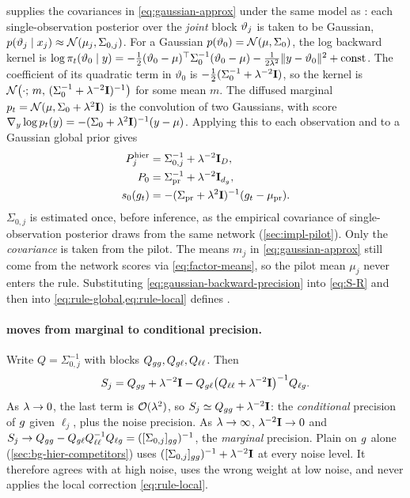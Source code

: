 \arrowm{} supplies the covariances in \cref{eq:gaussian-approx} under the same model as \gauss: each single-observation posterior over the \emph{joint} block $\vartheta_j$ is taken to be Gaussian, $p(\vartheta_j\mid x_j)\approx\mathcal{N}(\mu_j,\Sigma_{0,j})$.
For a Gaussian $p(\vartheta_0)=\mathcal{N}(\mu,\Sigma_0)$, the log backward kernel is
$\log\pi_t(\vartheta_0\mid y)=-\tfrac12(\vartheta_0-\mu)^\top\Sigma_0^{-1}(\vartheta_0-\mu)-\tfrac1{2\lambda^2}\|y-\vartheta_0\|^2+\text{const}$.
The coefficient of its quadratic term in $\vartheta_0$ is $-\tfrac12(\Sigma_0^{-1}+\lambda^{-2}\mathbf{I})$, so the kernel is $\mathcal{N}\big(\cdot;\,m,\,(\Sigma_0^{-1}+\lambda^{-2}\mathbf{I})^{-1}\big)$ for some mean $m$.
The diffused marginal $p_t=\mathcal{N}(\mu,\Sigma_0+\lambda^2\mathbf{I})$ is the convolution of two Gaussians, with score $\nabla_y\log p_t(y)=-(\Sigma_0+\lambda^2\mathbf{I})^{-1}(y-\mu)$.
Applying this to each observation and to a Gaussian global prior gives
\begin{equation}\label{eq:gaussian-backward-precision}
\begin{aligned}
  P_j^{\mathrm{hier}}&=\Sigma_{0,j}^{-1}+\lambda^{-2}\mathbf{I}_D,\\
  P_{0}&=\Sigma_\mathrm{pr}^{-1}+\lambda^{-2}\mathbf{I}_{d_g},\\
  s_0(g_t)&=-(\Sigma_\mathrm{pr}+\lambda^2\mathbf{I})^{-1}(g_t-\mu_\mathrm{pr}).
\end{aligned}
\end{equation}
$\Sigma_{0,j}$ is estimated once, before inference, as the empirical covariance of single-observation posterior draws from the same network (\cref{sec:impl-pilot}).
Only the \emph{covariance} is taken from the pilot.
The means $m_j$ in \cref{eq:gaussian-approx} still come from the network scores via \cref{eq:factor-means}, so the pilot mean $\mu_j$ never enters the rule.
Substituting \cref{eq:gaussian-backward-precision} into \cref{eq:S-R} and then into \cref{eq:rule-global,eq:rule-local} defines \arrowm.

\paragraph{\arrowm{} moves from marginal to conditional precision.}
Write $Q=\Sigma_{0,j}^{-1}$ with blocks $Q_{gg},Q_{g\ell},Q_{\ell\ell}$.
Then
\[
  S_j=Q_{gg}+\lambda^{-2}\mathbf{I}-Q_{g\ell}\big(Q_{\ell\ell}+\lambda^{-2}\mathbf{I}\big)^{-1}Q_{\ell g}.
\]
As $\lambda\to0$, the last term is $\mathcal{O}(\lambda^2)$, so $S_j\simeq Q_{gg}+\lambda^{-2}\mathbf{I}$: the \emph{conditional} precision of $g$ given $\ell_j$, plus the noise precision.
As $\lambda\to\infty$, $\lambda^{-2}\mathbf{I}\to0$ and $S_j\to Q_{gg}-Q_{g\ell}Q_{\ell\ell}^{-1}Q_{\ell g}=([\Sigma_{0,j}]_{gg})^{-1}$, the \emph{marginal} precision.
Plain \gauss{} on $g$ alone (\cref{sec:bg-hier-competitors}) uses $([\Sigma_{0,j}]_{gg})^{-1}+\lambda^{-2}\mathbf{I}$ at every noise level.
It therefore agrees with \arrowm{} at high noise, uses the wrong weight at low noise, and never applies the local correction \cref{eq:rule-local}.

